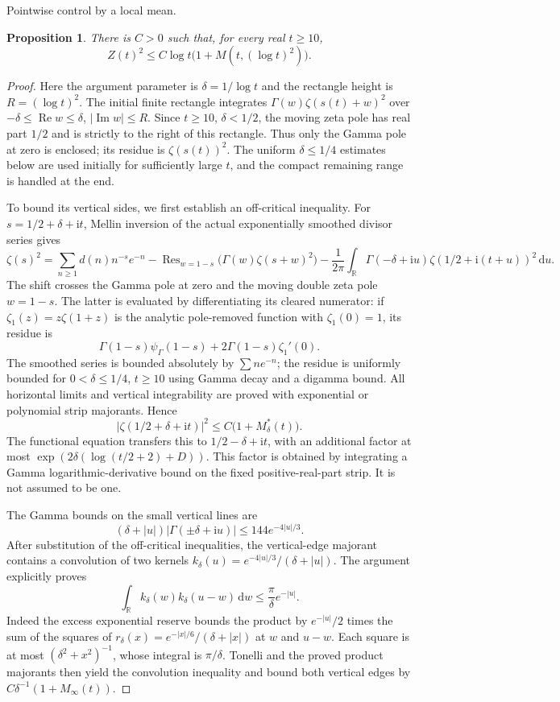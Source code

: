 \documentclass[11pt,a4paper]{article}
\numberwithin{equation}{section}
\newtheorem{proposition}[theorem]{Proposition}
\theoremstyle{definition}
\newcommand{\R}{\mathbb R}
\newcommand{\dd}{\,\mathrm d}
\newcommand{\ii}{\mathrm i}
\newcommand{\Rea}{\operatorname{Re}}
\newcommand{\Ima}{\operatorname{Im}}
\newcommand{\zabs}{Z}
\begin{document}
\par\medskip\noindent Pointwise control by a local mean.
\begin{proposition}\label{prop:pointmean}
There is $C>0$ such that, for every real $t\ge10$,
\[
 \zabs(t)^2\le C\log t\bigl(1+M(t,(\log t)^2)\bigr).
\]
\end{proposition}
\begin{proof}
Here the argument parameter is $\delta=1/\log t$ and the rectangle height is
$R=(\log t)^2$. The initial finite rectangle integrates
$\Gamma(w)\zeta(s(t)+w)^2$ over $-\delta\le\Rea w\le\delta$,
$|\Ima w|\le R$. Since $t\ge10$, $\delta<1/2$, the moving zeta pole has real part $1/2$
and is strictly to the right of this rectangle. Thus only the Gamma pole
at zero is enclosed; its residue is $\zeta(s(t))^2$. The uniform
$\delta\le1/4$ estimates below are used initially for sufficiently large
$t$, and the compact remaining range is handled at the end.

To bound its vertical sides, we first establish an off-critical
inequality. For $s=1/2+\delta+\ii t$, Mellin inversion of the actual
exponentially smoothed divisor series gives
\[
 \zeta(s)^2=\sum_{n\ge1}d(n)n^{-s}e^{-n}
     -\operatorname{Res}_{w=1-s}\bigl(\Gamma(w)\zeta(s+w)^2\bigr)
     -\frac1{2\pi}\int_{\R}\Gamma(-\delta+\ii u)
                    \zeta(1/2+\ii(t+u))^2\dd u.
\]
The shift crosses the Gamma pole at zero and the moving double zeta pole
$w=1-s$. The latter is evaluated by differentiating its cleared numerator:
if $\zeta_1(z)=z\zeta(1+z)$ is the analytic pole-removed function with
$\zeta_1(0)=1$, its residue is
\[
 \Gamma(1-s)\psi_\Gamma(1-s)+2\Gamma(1-s)\zeta_1'(0).
\]
The smoothed series is bounded absolutely by $\sum n e^{-n}$; the residue is
uniformly bounded for $0<\delta\le1/4$, $t\ge10$ using Gamma decay and a
digamma bound. All horizontal limits and vertical integrability are proved
with exponential or polynomial strip majorants. Hence
\[
 |\zeta(1/2+\delta+\ii t)|^2\le C\bigl(1+M_\delta^*(t)\bigr).
\]
The functional equation transfers this to $1/2-\delta+\ii t$, with an
additional factor at most
$\exp(2\delta(\log(t/2+2)+D))$. This factor is obtained by integrating a
Gamma logarithmic-derivative bound on the fixed positive-real-part strip.
It is not assumed to be one.

The Gamma bounds on the small vertical lines are
\[
 (\delta+|u|)|\Gamma(\pm\delta+\ii u)|\le144e^{-4|u|/3}.
\]
After substitution of the off-critical inequalities, the vertical-edge
majorant contains a convolution of two kernels
$k_\delta(u)=e^{-4|u|/3}/(\delta+|u|)$.
The argument explicitly proves
\[
 \int_{\R}k_\delta(w)k_\delta(u-w)\dd w
 \le\frac\pi\delta e^{-|u|}.
\]
Indeed the excess exponential reserve bounds the product by
$e^{-|u|}/2$ times the sum of the squares of
$r_\delta(x)=e^{-|x|/6}/(\delta+|x|)$ at $w$ and $u-w$.
Each square is at most $(\delta^2+x^2)^{-1}$, whose integral is
$\pi/\delta$. Tonelli and the proved product majorants then yield the
convolution inequality and bound both vertical edges by
$C\delta^{-1}(1+M_\infty(t))$.


\end{proof}
\end{document}

